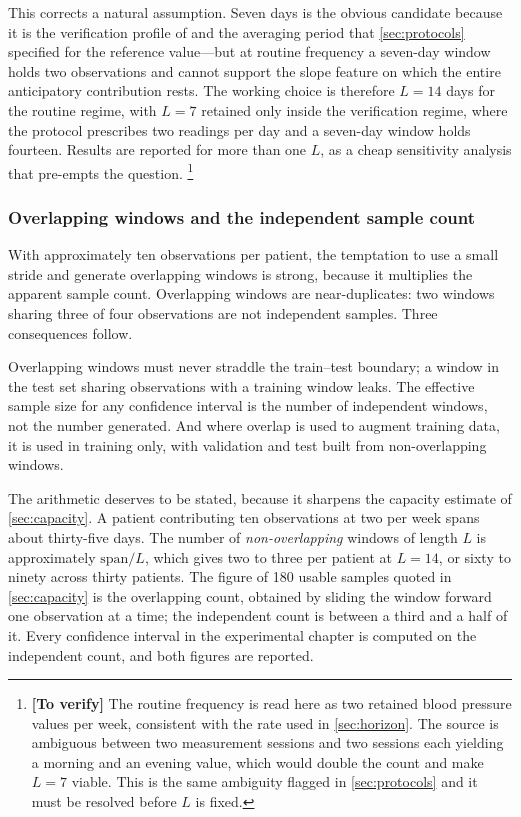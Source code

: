 \documentclass[12pt,a4paper,oneside]{report}
\newcommand{\verify}[1]{\footnote{\textbf{[To verify]} #1}}
\begin{document}
This corrects a natural assumption. Seven days is the obvious candidate because it is the verification profile of \textcite{mihevc2025} and the averaging period that \cref{sec:protocols} specified for the reference value---but at routine frequency a seven-day window holds two observations and cannot support the slope feature on which the entire anticipatory contribution rests. The working choice is therefore $L = 14$ days for the routine regime, with $L = 7$ retained only inside the verification regime, where the protocol prescribes two readings per day and a seven-day window holds fourteen. Results are reported for more than one $L$, as a cheap sensitivity analysis that pre-empts the question.%
\verify{The routine frequency is read here as two retained blood pressure values per week, consistent with the rate used in \cref{sec:horizon}. The source is ambiguous between two measurement sessions and two sessions each yielding a morning and an evening value, which would double the count and make $L=7$ viable. This is the same ambiguity flagged in \cref{sec:protocols} and it must be resolved before $L$ is fixed.}

\subsubsection{Overlapping windows and the independent sample count}\label{sec:overlap}

With approximately ten observations per patient, the temptation to use a small stride and generate overlapping windows is strong, because it multiplies the apparent sample count. Overlapping windows are near-duplicates: two windows sharing three of four observations are not independent samples. Three consequences follow.

Overlapping windows must never straddle the train--test boundary; a window in the test set sharing observations with a training window leaks. The effective sample size for any confidence interval is the number of independent windows, not the number generated. And where overlap is used to augment training data, it is used in training only, with validation and test built from non-overlapping windows.

The arithmetic deserves to be stated, because it sharpens the capacity estimate of \cref{sec:capacity}. A patient contributing ten observations at two per week spans about thirty-five days. The number of \emph{non-overlapping} windows of length $L$ is approximately $\mathrm{span}/L$, which gives two to three per patient at $L = 14$, or sixty to ninety across thirty patients. The figure of 180 usable samples quoted in \cref{sec:capacity} is the overlapping count, obtained by sliding the window forward one observation at a time; the independent count is between a third and a half of it. Every confidence interval in the experimental chapter is computed on the independent count, and both figures are reported.
\end{document}

